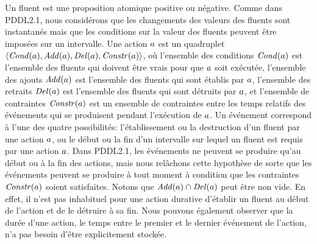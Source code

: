 Un fluent est une proposition atomique positive ou n\'{e}gative. Comme dans PDDL2.1, nous consid\'{e}rons que les changements des valeurs des fluents sont instantan\'{e}s mais que les conditions sur la valeur des fluents peuvent \^{e}tre impos\'{e}es sur un intervalle. Une action $a$ est un quadruplet $\langle\mathit{Cond}(a),\mathit{Add}(a),\mathit{Del}(a),\mathit{Constr}(a)\rangle$, o\`{u} l'ensemble des conditions $\mathit{Cond}(a)$ est l'ensemble des fluents qui doivent \^{e}tre vrais pour que $a$ soit ex\'{e}cut\'{e}e, l'ensemble des ajouts $\mathit{Add}(a)$ est l'ensemble des fluents qui sont \'{e}tablis par $a$, l'ensemble des retraits $\mathit{Del}(a)$ est l'ensemble des fluents qui sont d\'{e}truits par $a$, et l'ensemble de contraintes $\mathit{Constr}(a)$ est un ensemble de contraintes entre les temps relatifs des \'{e}v\'{e}nements qui se produisent pendant l'ex\'{e}cution de $a$. Un \'{e}v\'{e}nement correspond \`{a} l'une des quatre possibilit\'{e}s: l'\'{e}tablissement ou la destruction d'un fluent par une action $a$, ou le d\'{e}but ou la fin d'un intervalle sur lequel un fluent est requis par une action $a$. Dans PDDL2.1, les \'{e}v\'{e}nements ne peuvent se produire qu'au d\'{e}but ou \`{a} la fin des actions, mais nous rel\^{a}chons cette hypoth\`{e}se de sorte que les \'{e}v\'{e}nements peuvent se produire \`{a} tout moment \`{a} condition que les contraintes $\mathit{Constr}(a)$ soient satisfaites. Notons que $\mathit{Add}(a) \cap \mathit{Del}(a)$ peut \^{e}tre non vide. En effet, il n'est pas inhabituel pour une action durative d'\'{e}tablir un fluent au d\'{e}but de l'action et de le d\'{e}truire \`{a} sa fin. Nous pouvons \'{e}galement observer que la dur\'{e}e d'une action, le temps entre le premier et le dernier \'{e}v\'{e}nement de l'action, n'a pas besoin d'\^{e}tre explicitement stock\'{e}e.


